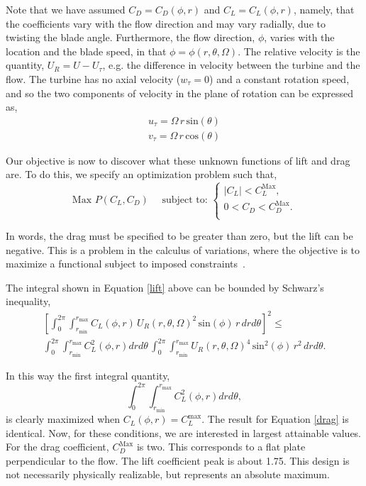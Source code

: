 Note that we have assumed $C_D = C_D(\phi,r)$ and $C_L = C_L(\phi,r)$,
namely, that the coefficients vary with the flow direction and may vary
radially, due to twisting the blade angle. Furthermore, the flow
direction, $\phi$, varies with the location and the blade speed,
in that $\phi=\phi(r,\theta,\Omega)$. The relative velocity is the
quantity, $U_R = U - U_\tau$, e.g. the difference in velocity between
the turbine and the flow. The turbine has no axial velocity ($w_\tau =
0$) and a constant rotation speed, and so the two components of velocity
in the plane of rotation can be expressed as,
\begin{align}
 u_\tau = \Omega \,r\, \text{sin}(\theta)\\
 v_\tau = \Omega \,r\, \text{cos}(\theta)
\end{align}

Our objective is now to discover what these unknown functions of lift
and drag are. To do this, we specify an optimization problem such that, 
\begin{equation*} 
 \text{Max } P(C_L,C_D) \quad \text{ subject to: }
  \begin{cases}
   |C_L| < C_L^{\text{Max}}, \\
   0 < C_D < C_D^{\text{Max}}. \\
  \end{cases}
\end{equation*}

In words, the drag must be specified to be greater than zero, but
the lift can be negative. This is a problem in the calculus of
variations, where the objective is to maximize a
functional subject to imposed
constraints~\cite{thornton2004classical,bradbury1968theoretical,2015JFM...784..565S}.   

%
The integral shown in Equation \ref{lift} above can be bounded by 
Schwarz's inequality,  
\begin{align*}
  \left[
    \int_0^{2\pi}
    \int_{r_{\text{min}}}^{r_{\text{max}}} C_L(\phi,r)\, U_R(r,\theta,\Omega)^2
 \,\text{sin}(\phi)\, r\,dr d\theta \right]^2 \le \\
  \int_0^{2\pi} \int_{r_{\text{min}}}^{r_{\text{max}}} C_L^2(\phi,r) dr d\theta\,
  \int_0^{2\pi} \int_{r_{\text{min}}}^{r_{\text{max}}} U_R(r,\theta,\Omega)^4 
 \,\text{sin}^2(\phi)\, r^2\,dr d\theta.
\end{align*}

In this way the first integral quantity,
\begin{equation}
  \int_0^{2\pi}
 \int_{r_{\text{min}}}^{r_{\text{max}}} C_L^2(\phi,r) dr d\theta, 
\end{equation}
is clearly maximized when $C_L(\phi,r) = C_L^{\text{max}}$. 
The result for Equation \ref{drag} is identical. Now, for these
conditions, we are interested in largest attainable values. For the drag
coefficient, $C_D^{\text{Max}}$ is two. %
This corresponds to a flat plate perpendicular to the flow.
The lift coefficient peak is about 1.75. This design is not necessarily
physically realizable, but represents an absolute maximum. 


